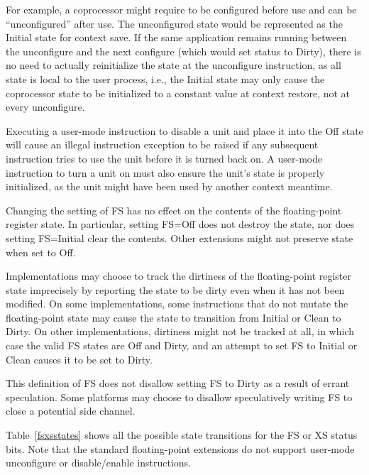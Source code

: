 For example, a coprocessor might require to be configured before use
and can be ``unconfigured'' after use.  The unconfigured state would
be represented as the Initial state for context save.  If the same
application remains running between the unconfigure and the next
configure (which would set status to Dirty), there is no need to
actually reinitialize the state at the unconfigure instruction, as all
state is local to the user process, i.e., the Initial state may only
cause the coprocessor state to be initialized to a constant value at
context restore, not at every unconfigure.

Executing a user-mode instruction to disable a unit and place it into
the Off state will cause an illegal instruction exception to be raised
if any subsequent instruction tries to use the unit before it is
turned back on.  A user-mode instruction to turn a unit on must also
ensure the unit's state is properly initialized, as the unit might
have been used by another context meantime.

Changing the setting of FS has no effect on the contents of the floating-point
register state.  In particular, setting FS=Off does not destroy the state, nor
does setting FS=Initial clear the contents.  Other extensions might not
preserve state when set to Off.

Implementations may choose to track the dirtiness of the floating-point
register state imprecisely by reporting the state to be dirty even when
it has not been modified.  On some implementations, some instructions that
do not mutate the floating-point state may cause the state to transition from
Initial or Clean to Dirty.  On other implementations, dirtiness might not be
tracked at all, in which case the valid FS states are Off and Dirty, and an
attempt to set FS to Initial or Clean causes it to be set to Dirty.
\begin{commentary}
This definition of FS does not disallow setting FS to Dirty as a result of
errant speculation.  Some platforms may choose to disallow speculatively
writing FS to close a potential side channel.
\end{commentary}

Table~\ref{fsxsstates} shows all the possible state transitions for
the FS or XS status bits.  Note that the standard floating-point
extensions do not support user-mode unconfigure or disable/enable
instructions.

